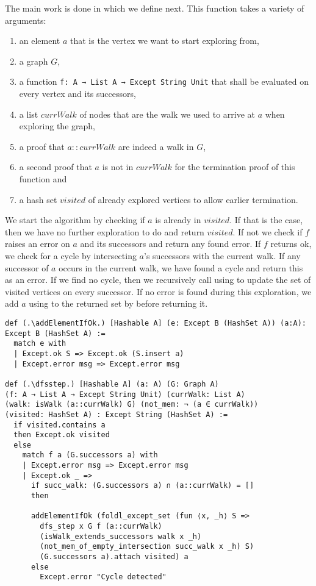 The main work is done in \dfsstep which we define next. This function takes a variety of arguments:
\begin{enumerate}
    \item an element $a$ that is the vertex we want to start exploring from,
    \item a graph $G$,
    \item a function \lstinline|f: A → List A → Except String Unit| that shall be evaluated on every vertex and its successors,
    \item a list $currWalk$ of nodes that are the walk we used to arrive at $a$ when exploring the graph,
    \item a proof that $a::currWalk$ are indeed a walk in $G$,
    \item a second proof that $a$ is not in $currWalk$ for the termination proof of this function and
    \item a hash set $visited$ of already explored vertices to allow earlier termination.
\end{enumerate}

We start the algorithm by checking if $a$ is already in $visited$. If that is the case, then we have no further exploration to do and return $visited$. If not we check if $f$ raises an error on $a$ and its successors and return any found error. If $f$ returns ok, we check for a cycle by intersecting $a$'s successors with the current walk. If any successor of $a$ occurs in the current walk, we have found a cycle and return this as an error. If we find no cycle, then we recursively call \dfsstep using \foldlexceptset to update the set of visited vertices on every successor. If no error is found during this exploration, we add $a$ using \addElementIfOk to the returned set by \foldlexceptset before returning it.

\begin{lstlisting}
def (.\addElementIfOk.) [Hashable A] (e: Except B (HashSet A)) (a:A): Except B (HashSet A) :=
  match e with
  | Except.ok S => Except.ok (S.insert a)
  | Except.error msg => Except.error msg

def (.\dfsstep.) [Hashable A] (a: A) (G: Graph A) 
(f: A → List A → Except String Unit) (currWalk: List A) 
(walk: isWalk (a::currWalk) G) (not_mem: ¬ (a ∈ currWalk)) 
(visited: HashSet A) : Except String (HashSet A) :=
  if visited.contains a
  then Except.ok visited
  else
    match f a (G.successors a) with
    | Except.error msg => Except.error msg
    | Except.ok _ =>
      if succ_walk: (G.successors a) ∩ (a::currWalk) = []
      then

      addElementIfOk (foldl_except_set (fun ⟨x, _h⟩ S =>
        dfs_step x G f (a::currWalk) 
        (isWalk_extends_successors walk x _h) 
        (not_mem_of_empty_intersection succ_walk x _h) S) 
        (G.successors a).attach visited) a
      else
        Except.error "Cycle detected"
\end{lstlisting}

